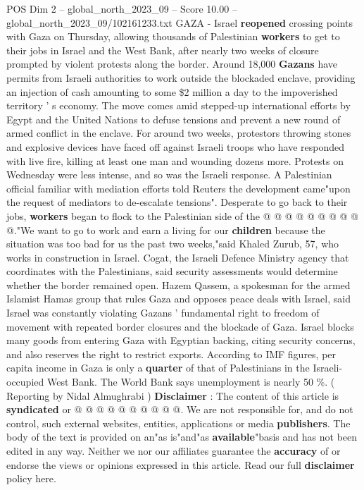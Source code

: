 \begin{textsample}{POS Dim 2 – global\_north\_2023\_09 – Score 10.00 – global\_north\_2023\_09/102161233.txt}  \label{ex:f2_pos_376}
GAZA - Israel \textbf{reopened} crossing points with Gaza on Thursday, allowing thousands of Palestinian \textbf{workers} to get to their jobs in Israel and the West Bank, after nearly two weeks of closure prompted by violent protests along the border.
Around 18,000 \textbf{Gazans} have permits from Israeli authorities to work outside the blockaded enclave, providing an injection of cash amounting to some \$2 million a day to the impoverished territory ' s economy.
The move comes amid stepped-up international efforts by Egypt and the United Nations to defuse tensions and prevent a new round of armed conflict in the enclave.
For around two weeks, protestors throwing stones and explosive devices have faced off against Israeli troops who have responded with live fire, killing at least one man and wounding dozens more.
Protests on Wednesday were less intense, and so was the Israeli response.
A Palestinian official familiar with mediation efforts told Reuters the development came"upon the request of mediators to de-escalate tensions".
Desperate to go back to their jobs, \textbf{workers} began to flock to the Palestinian side of the @ @ @ @ @ @ @ @ @ @."We want to go to work and earn a living for our \textbf{children} because the situation was too bad for us the past two weeks,"said Khaled Zurub, 57, who works in construction in Israel.
Cogat, the Israeli Defence Ministry agency that coordinates with the Palestinians, said security assessments would determine whether the border remained open.
Hazem Qassem, a spokesman for the armed Islamist Hamas group that rules Gaza and opposes peace deals with Israel, said Israel was constantly violating Gazans ' fundamental right to freedom of movement with repeated border closures and the blockade of Gaza.
Israel blocks many goods from entering Gaza with Egyptian backing, citing security concerns, and also reserves the right to restrict exports.
According to IMF figures, per capita income in Gaza is only a \textbf{quarter} of that of Palestinians in the Israeli-occupied West Bank.
The World Bank says unemployment is nearly 50 \%. ( Reporting by Nidal Almughrabi ) \textbf{Disclaimer} : The content of this article is \textbf{syndicated} or @ @ @ @ @ @ @ @ @ @.
We are not responsible for, and do not control, such external websites, entities, applications or media \textbf{publishers}.
The body of the text is provided on an"as is"and"as \textbf{available}"basis and has not been edited in any way.
Neither we nor our affiliates guarantee the \textbf{accuracy} of or endorse the views or opinions expressed in this article.
Read our full \textbf{disclaimer} policy here.

\end{textsample}
